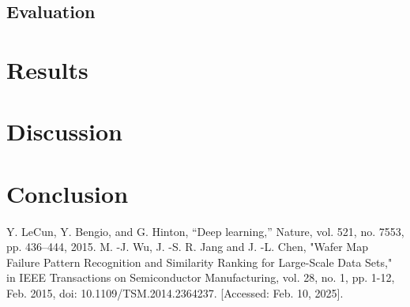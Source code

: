 \documentclass[conference]{IEEEtran}
\begin{document}
\subsection{Evaluation}


\section{Results} 


\section{Discussion}


\section{Conclusion}


\begin{thebibliography}{00}
 Y. LeCun, Y. Bengio, and G. Hinton, “Deep learning,” Nature, vol. 521, no. 7553, pp. 436–444, 2015.
 M. -J. Wu, J. -S. R. Jang and J. -L. Chen, "Wafer Map Failure Pattern Recognition and Similarity Ranking for Large-Scale Data Sets," in IEEE Transactions on Semiconductor Manufacturing, vol. 28, no. 1, pp. 1-12, Feb. 2015, doi: 10.1109/TSM.2014.2364237. [Accessed: Feb. 10, 2025].

\end{thebibliography}
\end{document}
